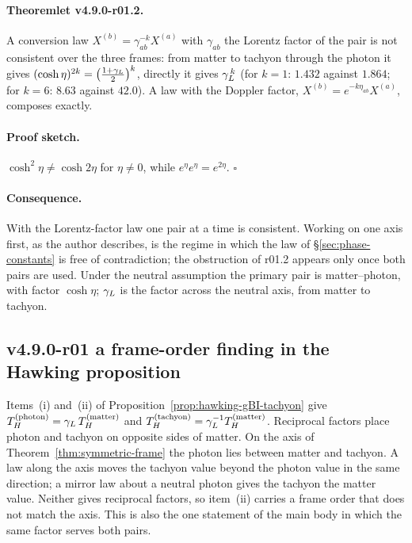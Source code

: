 \paragraph{Theoremlet v4.9.0-r01.2.}
A conversion law \(X^{(b)}=\gamma_{ab}^{-k}X^{(a)}\) with \(\gamma_{ab}\) the Lorentz factor of the pair is not
consistent over the three frames: from matter to tachyon through the photon it gives
\((\cosh\eta)^{2k}=\bigl(\tfrac{1+\gamma_L}{2}\bigr)^k\), directly it gives \(\gamma_L^{\,k}\) (for \(k=1\): \(1.432\) against
\(1.864\); for \(k=6\): \(8.63\) against \(42.0\)).  A law with the Doppler factor, \(X^{(b)}=e^{-k\eta_{ab}}X^{(a)}\),
composes exactly.

\paragraph{Proof sketch.}
\(\cosh^2\eta\neq\cosh2\eta\) for \(\eta\neq0\), while \(e^{\eta}e^{\eta}=e^{2\eta}\).  \(\square\)

\paragraph{Consequence.}
With the Lorentz-factor law one pair at a time is consistent.  Working on one axis first, as the author describes, is the
regime in which the law of \S\ref{sec:phase-constants} is free of contradiction; the obstruction of r01.2 appears only
once both pairs are used.  Under the neutral assumption the primary pair is matter--photon, with factor \(\cosh\eta\);
\(\gamma_L\) is the factor across the neutral axis, from matter to tachyon.

\subsection*{v4.9.0-r01 a frame-order finding in the Hawking proposition}
\label{subsec:v490-r01-hawking}

Items~(i) and~(ii) of Proposition~\ref{prop:hawking-gBI-tachyon} give \(T_H^{(\mathrm{photon})}=\gamma_L\,T_H^{(\mathrm{matter})}\)
and \(T_H^{(\mathrm{tachyon})}=\gamma_L^{-1}T_H^{(\mathrm{matter})}\).  Reciprocal factors place photon and tachyon on opposite
sides of matter.  On the axis of Theorem~\ref{thm:symmetric-frame} the photon lies between matter and tachyon.  A law along
the axis moves the tachyon value beyond the photon value in the same direction; a mirror law about a neutral photon gives
the tachyon the matter value.  Neither gives reciprocal factors, so item~(ii) carries a frame order that does not match the
axis.  This is also the one statement of the main body in which the same factor serves both pairs.

